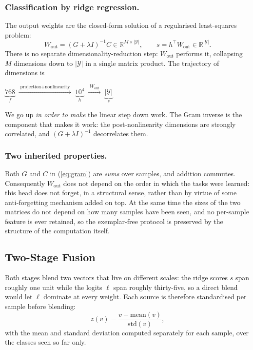 \documentclass[runningheads]{llncs}
\begin{document}
\subsubsection{Classification by ridge regression.}
The output weights are the closed-form solution of a regularised least-squares
problem:
\begin{equation}
W_{\mathrm{out}} = (G + \lambda I)^{-1} C \in \mathbb{R}^{M \times |\mathcal{Y}|},
\qquad
s = h^{\top} W_{\mathrm{out}} \in \mathbb{R}^{|\mathcal{Y}|} .
\label{eq:ridge}
\end{equation}
There is no separate dimensionality-reduction step: $W_{\mathrm{out}}$ performs
it, collapsing $M$ dimensions down to $|\mathcal{Y}|$ in a single matrix
product. The trajectory of dimensions is
\begin{center}
$\underbrace{768}_{f}
\;\xrightarrow{\;\text{projection} + \text{nonlinearity}\;}\;
\underbrace{10^4}_{h}
\;\xrightarrow{\;W_{\mathrm{out}}\;}\;
\underbrace{|\mathcal{Y}|}_{s}$
\end{center}
We go up \emph{in order to make} the linear step down work. The Gram inverse is
the component that makes it work: the post-nonlinearity dimensions are strongly
correlated, and $(G + \lambda I)^{-1}$ decorrelates them.

\subsubsection{Two inherited properties.}
Both $G$ and $C$ in (\ref{eq:gram}) are \emph{sums} over samples, and addition
commutes. Consequently $W_{\mathrm{out}}$ does not depend on the order in which
the tasks were learned: this head does not forget, in a structural sense, rather
than by virtue of some anti-forgetting mechanism added on top. At the same time
the sizes of the two matrices do not depend on how many samples have been seen,
and no per-sample feature is ever retained, so the exemplar-free protocol is
preserved by the structure of the computation itself.

\subsection{Two-Stage Fusion}

Both stages blend two vectors that live on different scales: the ridge scores $s$
span roughly one unit while the logits $\ell$ span roughly thirty-five, so a
direct blend would let $\ell$ dominate at every weight. Each source is therefore
standardised per sample before blending:
\begin{equation}
z(v) = \frac{v - \mathrm{mean}(v)}{\mathrm{std}(v)} ,
\label{eq:znorm}
\end{equation}
with the mean and standard deviation computed separately for each sample, over
the classes seen so far only.
\end{document}
